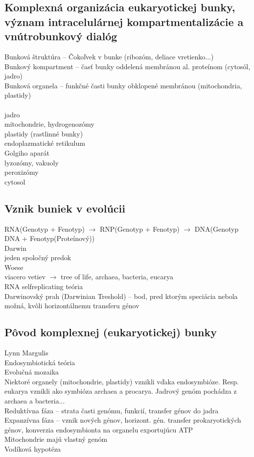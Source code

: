 \subsection*{Komplexná organizácia eukaryotickej bunky, význam intracelulárnej kompartmentalizácie a vnútrobunkový dialóg}
Bunková štruktúra -- Čokoľvek v bunke (ribozóm, deliace vretienko...)\\
Bunkový kompartment -- časť bunky oddelená membránou al. proteínom (cytosól, jadro)\\
Bunková organela -- funkčné časti bunky obklopené membránou (mitochondria, plastidy)\\
\\
jadro\\
mitochondrie, hydrogenozómy\\
plastidy (rastlinné bunky)\\
endoplazmatické retikulum\\
Golgiho aparát\\
lyzozómy, vakuoly\\
peroxizómy\\
cytosol\\
\subsection*{Vznik buniek v evolúcii}
RNA(Genotyp + Fenotyp) $\rightarrow$ RNP(Genotyp + Fenotyp) $\rightarrow$ DNA(Genotyp ~ DNA + Fenotyp(Proteínový))\\
Darwin\\
\tab jeden spoločný predok\\
Woese\\
\tab viacero vetiev $\rightarrow$ tree of life, archaea, bacteria, eucarya\\
\tab RNA selfreplicating teória\\
Darwinovský prah (Darwinian Treshold) -- bod, pred ktorým speciácia nebola možná, kvôli horizontálnemu transferu génov\\
\subsection*{Pôvod komplexnej (eukaryotickej) bunky}
Lynn Margulis\\
Endosymbiotická teória\\
Evolučná mozaika\\
Niektoré organely (mitochondrie, plastidy) vznikli vďaka endosymbióze. Resp. eukarya vznikli ako symbióza archaea a procarya. Jadrový genóm pochádza z archaea a bacteria...\\
Reduktívna fáza -- strata časti genómu, funkcií, transfer génov do jadra\\
Expanzívna fáza -- vznik nových génov, horizont. gén. transfer prokaryotických génov, konverzia endosymbionta na organelu exportujúcu ATP\\
Mitochondrie majú vlastný genóm\\
Vodíková hypotéza\\

